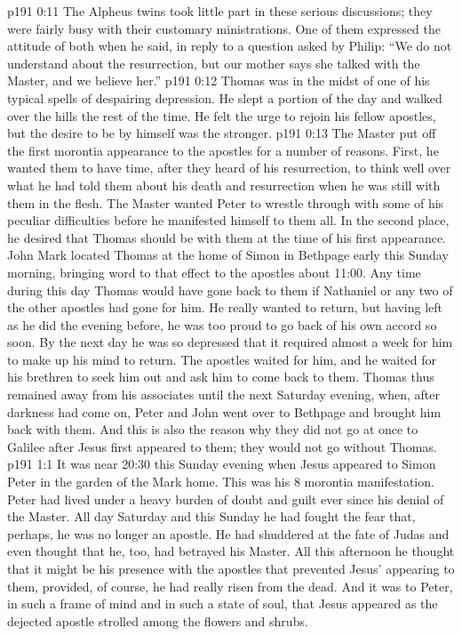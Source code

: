\vs p191 0:11 The Alpheus twins took little part in these serious discussions; they were fairly busy with their customary ministrations. One of them expressed the attitude of both when he said, in reply to a question asked by Philip: “We do not understand about the resurrection, but our mother says she talked with the Master, and we believe her.”
\vs p191 0:12 Thomas was in the midst of one of his typical spells of despairing depression. He slept a portion of the day and walked over the hills the rest of the time. He felt the urge to rejoin his fellow apostles, but the desire to be by himself was the stronger.
\vs p191 0:13 The Master put off the first morontia appearance to the apostles for a number of reasons. First, he wanted them to have time, after they heard of his resurrection, to think well over what he had told them about his death and resurrection when he was still with them in the flesh. The Master wanted Peter to wrestle through with some of his peculiar difficulties before he manifested himself to them all. In the second place, he desired that Thomas should be with them at the time of his first appearance. John Mark located Thomas at the home of Simon in Bethpage early this Sunday morning, bringing word to that effect to the apostles about 11:00. Any time during this day Thomas would have gone back to them if Nathaniel or any two of the other apostles had gone for him. He really wanted to return, but having left as he did the evening before, he was too proud to go back of his own accord so soon. By the next day he was so depressed that it required almost a week for him to make up his mind to return. The apostles waited for him, and he waited for his brethren to seek him out and ask him to come back to them. Thomas thus remained away from his associates until the next Saturday evening, when, after darkness had come on, Peter and John went over to Bethpage and brought him back with them. And this is also the reason why they did not go at once to Galilee after Jesus first appeared to them; they would not go without Thomas.
\vs p191 1:1 It was near 20:30 this Sunday evening when Jesus appeared to Simon Peter in the garden of the Mark home. This was his 8 morontia manifestation. Peter had lived under a heavy burden of doubt and guilt ever since his denial of the Master. All day Saturday and this Sunday he had fought the fear that, perhaps, he was no longer an apostle. He had shuddered at the fate of Judas and even thought that he, too, had betrayed his Master. All this afternoon he thought that it might be his presence with the apostles that prevented Jesus’ appearing to them, provided, of course, he had really risen from the dead. And it was to Peter, in such a frame of mind and in such a state of soul, that Jesus appeared as the dejected apostle strolled among the flowers and shrubs.
